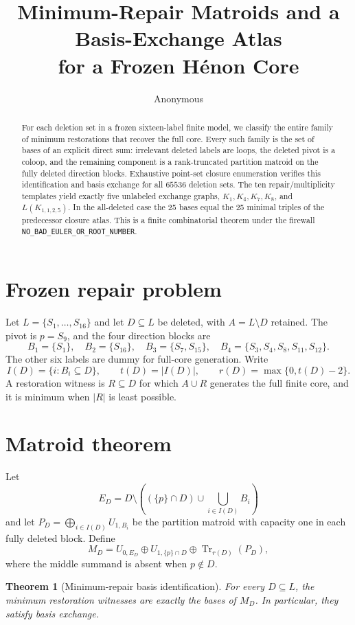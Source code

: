 \documentclass[10pt]{article}
\title{Minimum-Repair Matroids and a Basis-Exchange Atlas\\
for a Frozen H\'enon Core}
\author{Anonymous}
\date{}
\newtheorem{theorem}{Theorem}
\begin{document}
\maketitle

\begin{abstract}
For each deletion set in a frozen sixteen-label finite model, we classify the
entire family of minimum restorations that recover the full core.  Every such
family is the set of bases of an explicit direct sum: irrelevant deleted
labels are loops, the deleted pivot is a coloop, and the remaining component
is a rank-truncated partition matroid on the fully deleted direction blocks.
Exhaustive point-set closure enumeration verifies this identification and
basis exchange for all $65536$ deletion sets.  The ten repair/multiplicity
templates yield exactly five unlabeled exchange graphs,
$K_1,K_4,K_7,K_8$, and $L(K_{1,1,2,5})$.  In the all-deleted case the 25
bases equal the 25 minimal triples of the predecessor closure atlas.  This is
a finite combinatorial theorem under the firewall
\texttt{NO\_BAD\_EULER\_OR\_ROOT\_NUMBER}.
\end{abstract}

\section{Frozen repair problem}
Let $L=\{S_1,\ldots,S_{16}\}$ and let $D\subseteq L$ be deleted, with
$A=L\setminus D$ retained.  The pivot is $p=S_9$, and the four direction
blocks are
\[
B_1=\{S_1\},\quad B_2=\{S_{16}\},\quad
B_3=\{S_7,S_{15}\},\quad
B_4=\{S_3,S_4,S_8,S_{11},S_{12}\}.
\]
The other six labels are dummy for full-core generation.  Write
\[
 I(D)=\{i:B_i\subseteq D\},\qquad t(D)=|I(D)|,
 \qquad r(D)=\max\{0,t(D)-2\}.
\]
A restoration witness is $R\subseteq D$ for which $A\cup R$ generates the
full finite core, and it is minimum when $|R|$ is least possible.

\section{Matroid theorem}
Let
\[
 E_D=D\setminus\left((\{p\}\cap D)\cup
       \bigcup_{i\in I(D)}B_i\right)
\]
and let $P_D=\bigoplus_{i\in I(D)}U_{1,B_i}$ be the partition matroid with
capacity one in each fully deleted block.  Define
\[
 M_D=U_{0,E_D}\oplus
 U_{1,\{p\}\cap D}\oplus \operatorname{Tr}_{r(D)}(P_D),
\]
where the middle summand is absent when $p\notin D$.

\begin{theorem}[Minimum-repair basis identification]
For every $D\subseteq L$, the minimum restoration witnesses are exactly the
bases of $M_D$.  In particular, they satisfy basis exchange.
\end{theorem}
\end{document}
